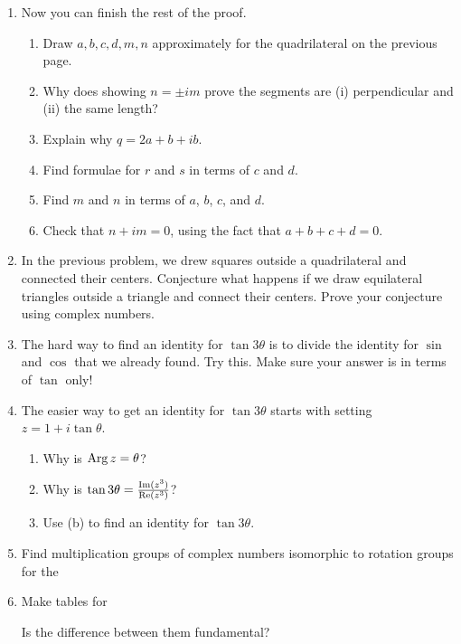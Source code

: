 \documentclass[../gatm.tex]{subfiles}
\begin{document}

\begin{enumerate}
\setcounter{enumi}{\value{cg_problem_i}}
\item Now you can finish the rest of the proof.
\begin{enumerate}
\item Draw $a,b,c,d,m,n$ approximately for the quadrilateral on the previous page.
\item Why does showing $n=\pm im$ prove the segments are (i) perpendicular and (ii) the same length?
\item Explain why $q=2a+b+ib$.
\item Find formulae for $r$ and $s$ in terms of $c$ and $d$.
\item Find $m$ and $n$ in terms of $a$, $b$, $c$, and $d$.
\item Check that $n+im=0$, using the fact that $a+b+c+d=0$.
\end{enumerate}
\item In the previous problem, we drew squares outside a quadrilateral and connected their centers. Conjecture what happens if we draw equilateral triangles outside a triangle and connect their centers. Prove your conjecture using complex numbers.
\item The hard way to find an identity for $\tan 3\theta$ is to divide the identity for $\sin$ and $\cos$ that we already found. Try this. Make sure your answer is in terms of $\tan$ only!
\item The easier way to get an identity for $\tan 3\theta$ starts with setting $z = 1 + i\tan\theta$.
\begin{enumerate}
\item Why is $\operatorname{Arg} z = \theta$?
\item Why is $\tan 3\theta = \frac{\operatorname{Im}(z^3)}{\operatorname{Re}(z^3)}$?
\item Use (b) to find an identity for $\tan 3\theta$.
\end{enumerate}
\item Find multiplication groups of complex numbers isomorphic to rotation groups for the
\begin{enumerate}
\end{enumerate}
\item Make tables for
\begin{enumerate}
\end{enumerate}
Is the difference between them fundamental?


\end{enumerate}
\end{document}
